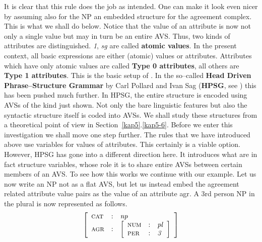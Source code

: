 It is clear that this rule does the job as intended. One can
make it look even nicer by assuming also for the NP an embedded
structure for the agreement complex. This is what we shall do
below. Notice that the value of an attribute is now not only
a single value but may in turn be an entire AVS. Thus, two kinds 
of attributes are distinguished.  {\it 1}, {\it sg\/} are called 
\textbf{atomic values}. In the present context, all basic expressions 
are either (atomic) values or attributes.
Attributes which have only atomic values are called \textbf{Type 0 
attributes}, all others are \textbf{Type 1 attributes}. This is the 
basic setup of \cite{gazdar:cstructures}. In the so--called
\textbf{Head Driven Phrase--Structure Grammar} by Carl Pollard
and Ivan Sag
(\textbf{HPSG}, see \cite{pollardsag:hpsg}) this has been pushed much
further. In HPSG, the entire structure is encoded using AVSs of the 
kind just shown.  Not only the bare linguistic features but 
also the syntactic structure itself is coded into AVSs. We shall 
study these structures from a theoretical point of view in 
Section~\ref{kap5}.\ref{kap5-6}. Before we enter this investigation
we shall move one step further. The rules that we have introduced
above use variables for values of attributes. This certainly
is a viable option. However, HPSG has gone into a different
direction here. It introduces what are in fact structure variables,
whose role it is to share entire AVSs between certain members of an 
AVS. To see how this works we continue with our example. Let us now 
write an NP not as a flat AVS, but let us instead embed
the agreement related attribute value pairs as the value
of an attribute {\sc agr}. A 3rd person NP in the plural
is now represented as follows.
\begin{equation}
\left[\begin{array}{l@{\quad : \quad}l}
\mbox{\sc cat} & \mbox{\it np\/} \\
\mbox{\sc agr} & \left[
    \begin{array}{l@{\quad : \quad}l}
    \mbox{\sc num} & \mbox{\it pl\/} \\
    \mbox{\sc per} & \mbox{\it 3\/}
    \end{array}\right]
\end{array}\right]
\end{equation}
